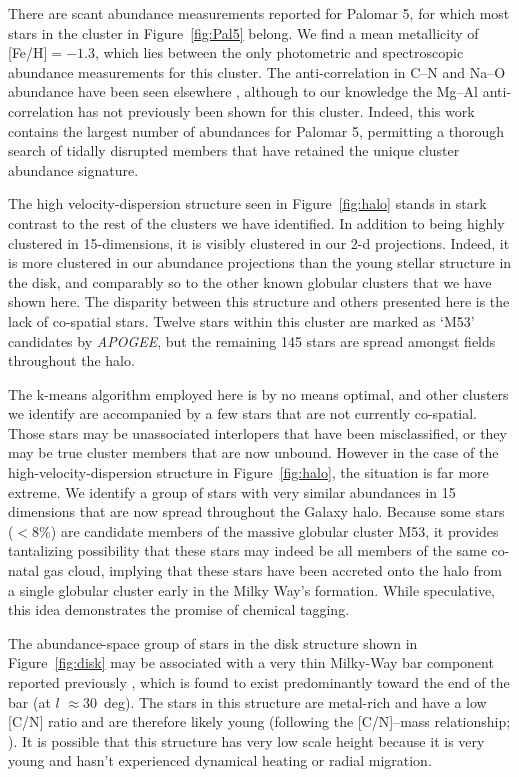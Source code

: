 \documentclass[manuscript, letterpaper]{aastex6}
\newcommand{\acronym}[1]{{\small{#1}}}
\newcommand{\project}[1]{\textsl{#1}}
\newcommand{\apogee}{\project{\acronym{APOGEE}}}
\renewcommand{\figurename}{Figure} %
\begin{document}
There are scant abundance measurements reported for Palomar 5, for which
most stars in the cluster in \figurename~\ref{fig:Pal5} belong. We find a mean
metallicity of [Fe/H]$ = -1.3$, which lies between the only
photometric \citep{Geisler_1997} and spectroscopic \citep{Smith_1985,Smith_2002} abundance
measurements for this cluster.  The anti-correlation in C--N and Na--O abundance
have been seen elsewhere \citep[][respectively]{Smith_1985,Smith_2002}, although
to our knowledge the Mg--Al anti-correlation has not previously been shown for this cluster.
Indeed, this work contains the largest number of abundances for Palomar 5,
permitting a thorough search of tidally disrupted members \citep[for example,][]{Kuzma_2015} 
that have retained the unique cluster abundance signature.

The high velocity-dispersion structure seen in \figurename~\ref{fig:halo} stands
in stark contrast to the rest of the clusters we have identified. In
addition to being highly clustered in 15-dimensions, it is visibly
clustered in our 2-d projections. Indeed, it is more clustered in our
abundance projections than the young stellar structure in the disk,
and comparably so to the other known globular clusters that we have
shown here. The disparity between this structure and others presented
here is the lack of co-spatial stars. Twelve stars within this cluster are
marked as `M53' candidates by \apogee, but the remaining 145 stars
are spread amongst fields throughout the halo.  

The k-means algorithm employed here is by no means optimal, and other clusters
we identify are accompanied by a few stars that are not currently co-spatial.
Those stars may be unassociated interlopers that have been misclassified,
or they may be true cluster members that are now unbound. However in the
case of the high-velocity-dispersion structure in \figurename~\ref{fig:halo},
the situation is far more extreme. We identify a group of stars with
very similar abundances in 15 dimensions that are now spread throughout
the Galaxy halo.
Because some stars ($<8\%$) are candidate members of the massive globular
cluster M53, it provides tantalizing possibility that these stars may
indeed be all members of the same co-natal gas cloud, implying that 
these stars have been accreted onto the halo from a single globular
cluster early in the Milky Way's formation. While speculative,
this idea demonstrates the promise of chemical tagging. 

The abundance-space group of stars in the disk structure shown in
\figurename~\ref{fig:disk} may be associated with a very thin
Milky-Way bar component reported previously \citep{wegg}, which is
found to exist predominantly toward the end of the bar (at $l$
$\approx 30$~deg).
The stars in this structure are metal-rich and have a low
[C/N] ratio and are therefore likely young (following the [C/N]--mass
relationship; \citealt{martig}).
It is possible that this structure has very low scale height because
it is very young and hasn't experienced dynamical heating or radial
migration.
\end{document}
